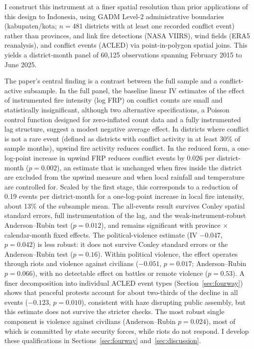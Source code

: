 \documentclass[12pt]{article}
\begin{document}
I construct this instrument at a finer spatial resolution than prior applications of this design to Indonesia, using GADM Level-2 administrative boundaries (kabupaten/kota; $n=481$ districts with at least one recorded conflict event) rather than provinces, and link fire detections (NASA VIIRS), wind fields (ERA5 reanalysis), and conflict events (ACLED) via point-in-polygon spatial joins. This yields a district-month panel of 60,125 observations spanning February 2015 to June 2025.

The paper's central finding is a contrast between the full sample and a conflict-active subsample. In the full panel, the baseline linear IV estimates of the effect of instrumented fire intensity (log FRP) on conflict counts are small and statistically insignificant, although two alternative specifications, a Poisson control function designed for zero-inflated count data \citep[following][]{lu2023fish} and a fully instrumented lag structure, suggest a modest negative average effect. In districts where conflict is not a rare event (defined as districts with conflict activity in at least 30\% of sample months), upwind fire activity reduces conflict. In the reduced form, a one-log-point increase in upwind FRP reduces conflict events by 0.026 per district-month ($p=0.002$), an estimate that is unchanged when fires inside the district are excluded from the upwind measure and when local rainfall and temperature are controlled for. Scaled by the first stage, this corresponds to a reduction of 0.19 events per district-month for a one-log-point increase in local fire intensity, about 13\% of the subsample mean. The all-events result survives Conley spatial standard errors, full instrumentation of the lag, and the weak-instrument-robust Anderson--Rubin test ($p=0.012$), and remains significant with province $\times$ calendar-month fixed effects. The political-violence estimate (IV $-0.047$, $p=0.042$) is less robust: it does not survive Conley standard errors or the Anderson--Rubin test ($p=0.16$). Within political violence, the effect operates through riots and violence against civilians ($-0.051$, $p=0.017$; Anderson--Rubin $p=0.066$), with no detectable effect on battles or remote violence ($p=0.53$). A finer decomposition into individual ACLED event types (Section~\ref{sec:fourway}) shows that peaceful protests account for about two-thirds of the decline in all events ($-0.123$, $p=0.010$), consistent with haze disrupting public assembly, but this estimate does not survive the stricter checks. The most robust single component is violence against civilians (Anderson--Rubin $p=0.024$), most of which is committed by state security forces, while riots do not respond. I develop these qualifications in Sections~\ref{sec:fourway} and~\ref{sec:discussion}.
\end{document}

